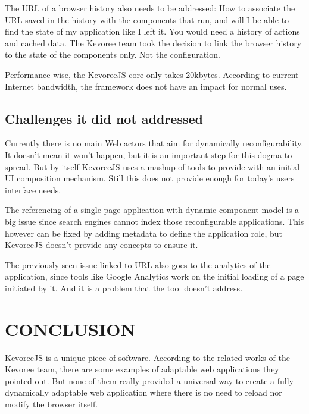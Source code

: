 \documentclass{aes2e}
\begin{document}
The URL of a browser history also needs to be addressed: How to associate the URL saved in the history with the components that run, and will I be able to find the state of my application like I left it. You would need a history of actions and cached data\cite{DEK1}. The Kevoree team took the decision to link the browser history to the state of the components only. Not the configuration.
\linebreak
 
Performance wise, the KevoreeJS core only takes 20kbytes. According to current Internet bandwidth, the framework does not have an impact for normal uses.


\subsection{Challenges it did not addressed}

Currently there is no main Web actors that aim for dynamically reconfigurability. It doesn't mean it won't happen, but it is an important step for this dogma to spread. But by itself KevoreeJS uses a mashup of tools to provide with an initial UI composition mechanism. Still this does not provide enough for today's users interface needs.
\linebreak
 
The referencing of a single page application with dynamic component model is a big issue since search engines cannot index those reconfigurable applications. This however can be fixed by adding metadata to define the application role, but KevoreeJS doesn't provide any concepts to ensure it.
\linebreak
 
The previously seen issue linked to URL also goes to the analytics of the application, since tools like Google Analytics work on the initial loading of a page initiated by it. And it is a problem that the tool doesn't address.

\section{CONCLUSION}
KevoreeJS is a unique piece of software. According to the related works of the Kevoree team\cite{DEK1}, there are some examples of adaptable web applications they pointed out. But none of them really provided a universal way to create a fully dynamically adaptable web application where there is no need to reload nor modify the browser itself. 
\linebreak
 
\end{document}

